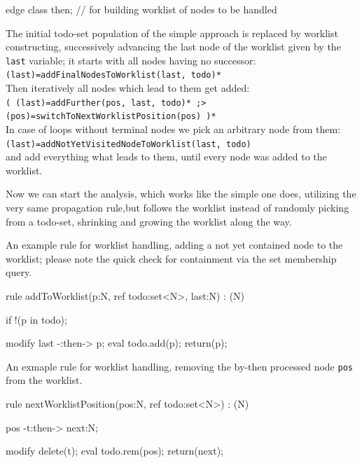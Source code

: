   \begin{example}
    \begin{grgen}
edge class then; // for building worklist of nodes to be handled
    \end{grgen}
  \end{example}

\noindent The initial todo-set population of the simple approach is replaced by worklist constructing, successively advancing the last node of the worklist given by the \verb#last# variable; it starts with all nodes having no successor:\\
\verb#(last)=addFinalNodesToWorklist(last, todo)*#\\
Then iteratively all nodes which lead to them get added:\\
\verb#( (last)=addFurther(pos, last, todo)* ;> (pos)=switchToNextWorklistPosition(pos) )*#\\
In case of loops without terminal nodes we pick an arbitrary node from them:\\ \verb#(last)=addNotYetVisitedNodeToWorklist(last, todo)#\\
and add everything what leads to them, until every node was added to the worklist.

Now we can start the analysis, which works like the simple one does, utilizing the very same propagation rule,but follows the worklist instead of randomly picking from a todo-set, shrinking and growing the worklist along the way.

  \begin{example}
An example rule for worklist handling, adding a not yet contained node to the worklist; please note the quick check for containment via the set membership query.
    \begin{grgen}
rule addToWorklist(p:N, ref todo:set<N>, last:N) : (N)
{
  if{ !(p in todo); }

  modify {
    last -:then-> p;
    eval { todo.add(p); }
    return(p);
  }
}
    \end{grgen}
  \end{example}

  \begin{example}
An exmaple rule for worklist handling, removing the by-then processed node \texttt{pos} from the worklist.
    \begin{grgen}
rule nextWorklistPosition(pos:N, ref todo:set<N>) : (N)
{
  pos -t:then-> next:N;

  modify {
    delete(t);
    eval { todo.rem(pos); }
    return(next);
  }
}
    \end{grgen}
  \end{example}

